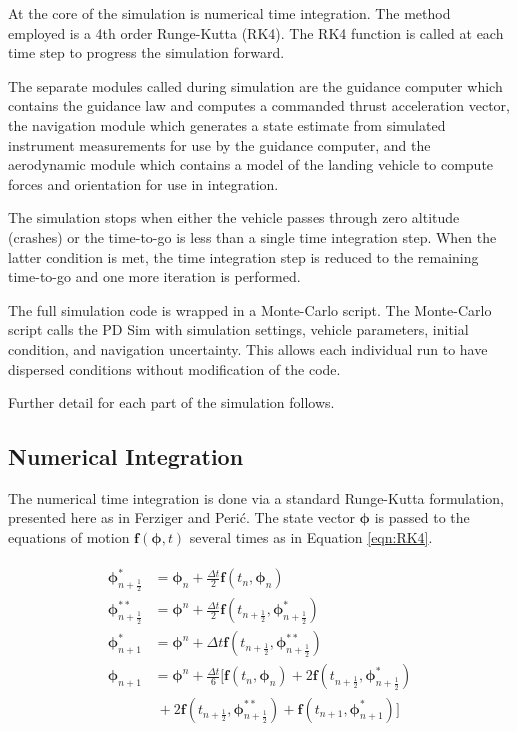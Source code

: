 At the core of the simulation is numerical time integration. The method employed is a 4th order Runge-Kutta (RK4). The RK4 function is called at each time step to progress the simulation forward.

The separate modules called during simulation are the guidance computer which contains the guidance law and computes a commanded thrust acceleration vector, the navigation module which generates a state estimate from simulated instrument measurements for use by the guidance computer, and the aerodynamic module which contains a model of the landing vehicle to compute forces and orientation for use in integration.

The simulation stops when either the vehicle passes through zero altitude (crashes) or the time-to-go is less than a single time integration step. When the latter condition is met, the time integration step is reduced to the remaining time-to-go and one more iteration is performed.

The full simulation code is wrapped in a Monte-Carlo script. The Monte-Carlo script calls the PD Sim with simulation settings, vehicle parameters, initial condition, and navigation uncertainty. This allows each individual run to have dispersed conditions without modification of the code.

Further detail for each part of the simulation follows.

\subsection{Numerical Integration}
The numerical time integration is done via a standard Runge-Kutta formulation, presented here as in Ferziger and Peri\'c\:\cite{FERZIGER}. The state vector $\boldsymbol{\phi}$ is passed to the equations of motion $\bm{f}(\bm{\phi},t)$ several times as in Equation \ref{eqn:RK4}.

\begin{align}
\label{eqn:RK4}
\begin{split}
\boldsymbol{\phi}_{n+\frac{1}{2}}^* &= \bm{\phi}_n + \frac{\Delta t}{2} \bm{f}(t_n,\bm{\phi}_n)\\
\boldsymbol{\phi}_{n+\frac{1}{2}}^{**} &= \bm{\phi}^n + \frac{\Delta t}{2}  \bm{f}(t_{n+\frac{1}{2}},\bm{\phi}^*_{n+\frac{1}{2}})\\
\boldsymbol{\phi}_{n+1}^* &= \bm{\phi}^n + \Delta t  \bm{f}(t_{n+\frac{1}{2}},\bm{\phi}^{**}_{n+\frac{1}{2}})\\
\boldsymbol{\phi}_{n+1} &= \bm{\phi}^n + \frac{\Delta t}{6}
[\bm{f}(t_n,\bm{\phi}_{n})
+ 2\bm{f}(t_{n+\frac{1}{2}},\bm{\phi}^*_{n+\frac{1}{2}})\\
&\:+ 2\bm{f}(t_{n+\frac{1}{2}},\bm{\phi}^{**}_{n+\frac{1}{2}})
+ \bm{f}(t_{n+1},\bm{\phi}_{n+1}^*)]
\end{split}
\end{align}



